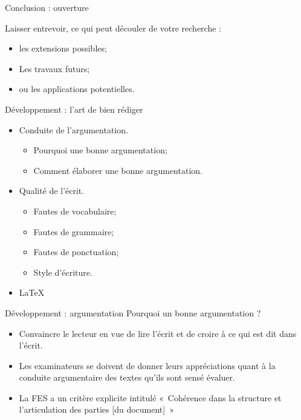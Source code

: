 \documentclass[french]{beamer}
\begin{document}
\begin{frame}{Conclusion : ouverture}

Laisser entrevoir, ce qui peut découler de votre recherche :
\begin{itemize}
	\item les extensions possibles;
	\item Les travaux futurs;
	\item ou les applications potentielles.
\end{itemize}
\end{frame}

\begin{frame}{Développement : l'art de bien rédiger}
\begin{itemize}
	\item Conduite de l'argumentation.
	\begin{itemize}
		\item Pourquoi une bonne argumentation;
		\item Comment élaborer une bonne argumentation.
	\end{itemize}
	\item Qualité de l'écrit.
	\begin{itemize}
		\item Fautes de vocabulaire;
		\item Fautes de grammaire;
		\item Fautes de ponctuation;
		\item Style d'écriture.
	\end{itemize}
	\item \LaTeX
\end{itemize}
\end{frame}

\begin{frame}{Développement : argumentation}
Pourquoi un bonne argumentation ?

\begin{itemize}
	\item Convaincre le lecteur en vue de lire l'écrit et de croire à ce qui est dit dans l'écrit.
	\item Les examinateurs se doivent de donner leurs appréciations quant à la conduite argumentaire des textes qu'ils sont sensé évaluer.
	\item La FES a un critère explicite intitulé «~Cohérence dans la structure et l'articulation des parties [du document]~»
\end{itemize}

\end{frame}
\end{document}

